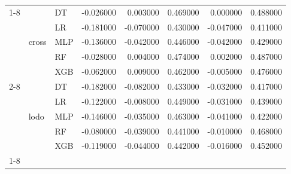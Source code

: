 \begin{tabular}{lllrrrrr}
\cline{1-8} \cline{2-8}
\multirow[t]{10}{*}{shift_filter} & \multirow[t]{5}{*}{cross} & DT & -0.026000 & 0.003000 & 0.469000 & 0.000000 & 0.488000 \\
 &  & LR & -0.181000 & -0.070000 & 0.430000 & -0.047000 & 0.411000 \\
 &  & MLP & -0.136000 & -0.042000 & 0.446000 & -0.042000 & 0.429000 \\
 &  & RF & -0.028000 & 0.004000 & 0.474000 & 0.002000 & 0.487000 \\
 &  & XGB & -0.062000 & 0.009000 & 0.462000 & -0.005000 & 0.476000 \\
\cline{2-8}
 & \multirow[t]{5}{*}{lodo} & DT & -0.182000 & -0.082000 & 0.433000 & -0.032000 & 0.417000 \\
 &  & LR & -0.122000 & -0.008000 & 0.449000 & -0.031000 & 0.439000 \\
 &  & MLP & -0.146000 & -0.035000 & 0.463000 & -0.041000 & 0.422000 \\
 &  & RF & -0.080000 & -0.039000 & 0.441000 & -0.010000 & 0.468000 \\
 &  & XGB & -0.119000 & -0.044000 & 0.442000 & -0.016000 & 0.452000 \\
\cline{1-8} \cline{2-8}
\bottomrule
\end{tabular}
